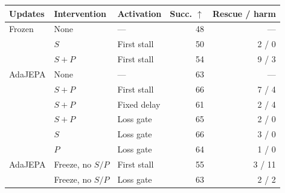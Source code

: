 \label{tab:maze-controls}
\small
\setlength{\tabcolsep}{2.2pt}
\begin{tabular}{lllrr}
\toprule
Updates & Intervention & Activation & Succ. $\uparrow$ & Rescue / harm\\
\midrule
Frozen & None &---&48&---\\
& $S$ &First stall&50&2 / 0\\
& $S{+}P$ &First stall&54&9 / 3\\
\midrule
AdaJEPA & None &---&63&---\\
& $S{+}P$ &First stall&66&7 / 4\\
& $S{+}P$ &Fixed delay&61&2 / 4\\
& $S{+}P$ &Loss gate&65&2 / 0\\
& $S$ &Loss gate&66&3 / 0\\
& $P$ &Loss gate&64&1 / 0\\
\midrule
AdaJEPA & Freeze, no $S/P$ &First stall&55&3 / 11\\
& Freeze, no $S/P$ &Loss gate&63&2 / 2\\
\bottomrule
\end{tabular}
